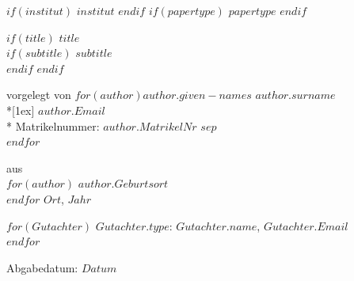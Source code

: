 \let\oldtable\table
\let\endoldtable\endtable
\renewenvironment{table}[1][htpb]
  {\oldtable[#1]}
  {\endoldtable}








\pagestyle{scrheadings}

  \clearscrheadfoot
  \ihead[]{\headmark} %
  \chead[]{} %
  \ohead{} %
  \ofoot[]{\pagemark} %
  \setheadsepline{.2pt}
  \setfootsepline{.2pt}



\begin{titlepage}
\begin {center}
\sffamily
\setlength\parindent{0pt}


\vfill
$if(institut)$ $institut$
$endif$
\vfill
$if(papertype)$ \Large $papertype$
$endif$
\vfill

$if(title)$
{\huge \bfseries $title$} \\[1ex]
$if(subtitle)$
{\Large \bfseries $subtitle$} \\[1cm]
$endif$
$endif$

\normalsize vorgelegt von
\vfill
$for(author)$\Large $author.given-names$ $author.surname$\\*[1ex]
\normalsize $author.Email$\\*
Matrikelnummer: $author.MatrikelNr$ $sep$\\[1cm]
$endfor$

\vfill
aus\\
$for(author)$ $author.Geburtsort$\\
$endfor$
\vfill
$Ort$, $Jahr$
\vfill

$for(Gutachter)$
$Gutachter.type$: $Gutachter.name$, $Gutachter.Email$\\
$endfor$

\vfill

Abgabedatum: $Datum$
\end{center}
\end{titlepage}



